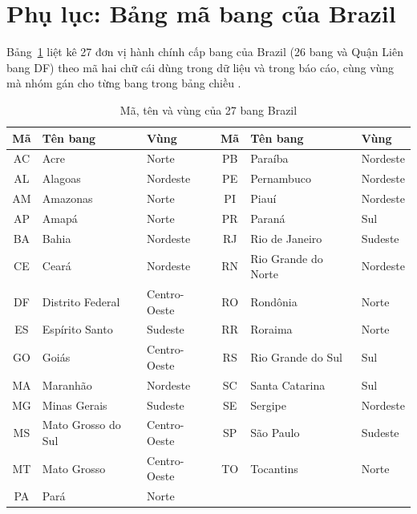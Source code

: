 \section{Phụ lục: Bảng mã bang của Brazil}\label{sec:mabang}

Bảng~\ref{tab:mabang} liệt kê 27 đơn vị hành chính cấp bang của Brazil (26 bang và Quận Liên bang DF) theo mã hai chữ cái dùng trong dữ liệu và trong báo cáo, cùng vùng mà nhóm gán cho từng bang trong bảng chiều .

\begin{table}[H]
\centering
\small
\caption{Mã, tên và vùng của 27 bang Brazil}\label{tab:mabang}
\begin{tabular}{|c|l|l||c|l|l|}
\hline
\textbf{Mã} & \textbf{Tên bang} & \textbf{Vùng} & \textbf{Mã} & \textbf{Tên bang} & \textbf{Vùng}\\ \hline
AC & Acre & Norte & PB & Paraíba & Nordeste\\ \hline
AL & Alagoas & Nordeste & PE & Pernambuco & Nordeste\\ \hline
AM & Amazonas & Norte & PI & Piauí & Nordeste\\ \hline
AP & Amapá & Norte & PR & Paraná & Sul\\ \hline
BA & Bahia & Nordeste & RJ & Rio de Janeiro & Sudeste\\ \hline
CE & Ceará & Nordeste & RN & Rio Grande do Norte & Nordeste\\ \hline
DF & Distrito Federal & Centro-Oeste & RO & Rondônia & Norte\\ \hline
ES & Espírito Santo & Sudeste & RR & Roraima & Norte\\ \hline
GO & Goiás & Centro-Oeste & RS & Rio Grande do Sul & Sul\\ \hline
MA & Maranhão & Nordeste & SC & Santa Catarina & Sul\\ \hline
MG & Minas Gerais & Sudeste & SE & Sergipe & Nordeste\\ \hline
MS & Mato Grosso do Sul & Centro-Oeste & SP & São Paulo & Sudeste\\ \hline
MT & Mato Grosso & Centro-Oeste & TO & Tocantins & Norte\\ \hline
PA & Pará & Norte & & & \\ \hline
\end{tabular}
\end{table}
